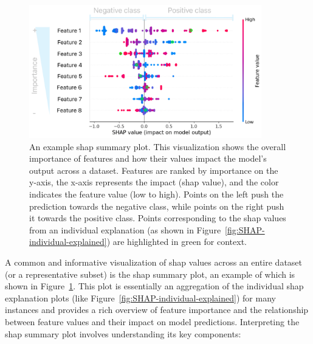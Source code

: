 \documentclass[12pt,a4paper]{report}
\begin{document}
\begin{figure}[h!]
  \centering
  \includegraphics[width=0.9\textwidth]{images/SHAP-explained.png}
  \caption[Example \gls{shap} Summary Plot]{An example \gls{shap} summary plot. This visualization shows the overall importance of features and how their values impact the model's output across a dataset. Features are ranked by importance on the y-axis, the x-axis represents the impact (\gls{shap} value), and the color indicates the feature value (low to high). Points on the left push the prediction towards the negative class, while points on the right push it towards the positive class. Points corresponding to the \gls{shap} values from an individual explanation (as shown in Figure~\ref{fig:SHAP-individual-explained}) are highlighted in green for context.}
  \label{fig:SHAP-plot-explained}
\end{figure}
\noindent
A common and informative visualization of \gls{shap} values across an entire dataset (or a representative subset) is the \gls{shap} summary plot, an example of which is shown in Figure~\ref{fig:SHAP-plot-explained}. This  plot is essentially an aggregation of the individual \gls{shap} explanation plots (like Figure~\ref{fig:SHAP-individual-explained}) for many instances and provides a rich overview of feature importance and the relationship between feature values and their impact on model predictions. Interpreting the \gls{shap} summary plot involves understanding its key components:
\pagebreak
\end{document}
